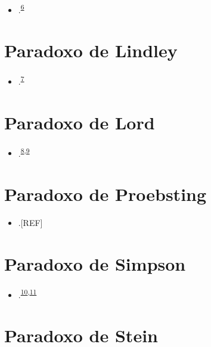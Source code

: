 \documentclass[
]{book}
\providecommand{\tightlist}{%
  \setlength{\itemsep}{0pt}\setlength{\parskip}{0pt}}
\begin{document}
\begin{itemize}
\tightlist
\item
  .\textsuperscript{\protect\hyperlink{ref-hand1992}{6}}
\end{itemize}

\hypertarget{lindley}{%
\section{Paradoxo de Lindley}\label{lindley}}

\begin{itemize}
\tightlist
\item
  .\textsuperscript{\protect\hyperlink{ref-lindley1957}{7}}
\end{itemize}

\hypertarget{lord}{%
\section{Paradoxo de Lord}\label{lord}}

\begin{itemize}
\tightlist
\item
  .\textsuperscript{\protect\hyperlink{ref-lord1967}{8},\protect\hyperlink{ref-lord1969}{9}}
\end{itemize}

\hypertarget{proebsting}{%
\section{Paradoxo de Proebsting}\label{proebsting}}

\begin{itemize}
\tightlist
\item
  .{[}REF{]}
\end{itemize}

\hypertarget{simpson}{%
\section{Paradoxo de Simpson}\label{simpson}}

\begin{itemize}
\tightlist
\item
  .\textsuperscript{\protect\hyperlink{ref-simpson1951}{10},\protect\hyperlink{ref-blyth1972}{11}}
\end{itemize}

\hypertarget{stein}{%
\section{Paradoxo de Stein}\label{stein}}
\end{document}
